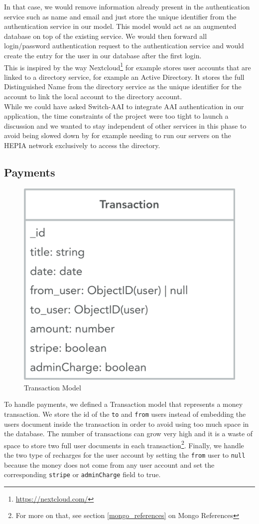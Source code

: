 \documentclass[11pt,a4paper]{report}
\begin{document}
In that case, we would remove information already present in the authentication service such as name and email and just store the unique identifier from the authentication service in our model. This model would act as an augmented database on top of the existing service. We would then forward all login/password authentication request to the authentication service and would create the entry for the user in our database after the first login.\\

This is inspired by the way Nextcloud\footnote{\url{https://nextcloud.com/}} for example stores user accounts that are linked to a directory service, for example an Active Directory. It stores the full Distinguished Name from the directory service as the unique identifier for the account to link the local account to the directory account.\\

While we could have asked Switch-AAI to integrate AAI authentication in our application, the time constraints of the project were too tight to launch a discussion and we wanted to stay independent of other services in this phase to avoid being slowed down by for example needing to run our servers on the HEPIA network exclusively to access the directory.
\subsection{Payments}
\begin{figure}[H]
\begin{center}
	\includegraphics[width=.4\textwidth]{assets/transaction_model}
	\caption{Transaction Model}
\end{center}
\end{figure}
To handle payments, we defined a Transaction model that represents a money transaction. We store the id of the \verb+to+ and \verb+from+ users instead of embedding the users document inside the transaction in order to avoid using too much space in the database. The number of transactions can grow very high and it is a waste of space to store two full user documents in each transaction\footnote{For more on that, see section \ref{mongo_references} on Mongo References}. Finally, we handle the two type of recharges for the user account by setting the \verb+from+ user to \verb+null+ because the money does not come from any user account and set the corresponding \verb+stripe+ or \verb+adminCharge+ field to true. \\
\end{document}
